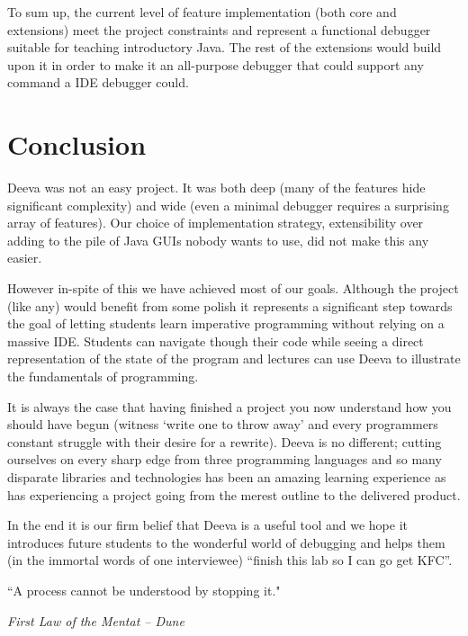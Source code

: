 \documentclass[11pt, a4paper]{article}
\newlength\longest
\begin{document}
To sum up, the current level of feature implementation (both core and extensions) meet the project constraints and represent a functional debugger suitable for teaching introductory Java.
The rest of the extensions would build upon it in order to make it an all-purpose debugger that could support any command a IDE debugger could.



\section{Conclusion}

Deeva was not an easy project.
It was both deep (many of the features hide significant complexity) and wide (even a minimal debugger requires a surprising array of features).
Our choice of implementation strategy, extensibility over adding to the pile of Java GUIs nobody wants to use, did not make this any easier.

However in-spite of this we have achieved most of our goals.
Although the project (like any) would benefit from some polish it represents a significant step towards the goal of letting students learn imperative programming without relying on a massive IDE. 
Students can navigate though their code while seeing a direct representation of the state of the program and lectures can use Deeva to illustrate the fundamentals of programming.

It is always the case that having finished a project you now understand how you should have begun (witness `write one to throw away' and every programmers constant struggle with their desire for a rewrite).
Deeva is no different; cutting ourselves on every sharp edge from three programming languages and so many disparate libraries and technologies has been an amazing learning experience as has experiencing a project going from the merest outline to the delivered product. 


In the end it is our firm belief that Deeva is a useful tool and we hope it introduces future students to the wonderful world of debugging and helps them (in the immortal words of one interviewee) ``finish this lab so I can go get KFC''. 


\clearpage
\thispagestyle{empty}
\null\vfill
\begin{center}
\settowidth{}
\parbox{\longest}{%
  \raggedright{%
  ``A process cannot be understood by stopping it." \\
  }
  \raggedright{\emph{First Law of the Mentat -- Dune}}\par%
}
\end{center}
\vfill\vfill
\clearpage
\end{document}
